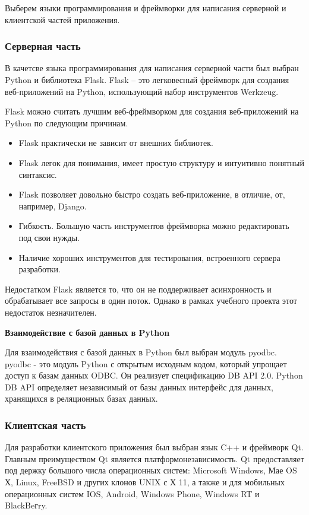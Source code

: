 \documentclass[a4paper,14pt]{article}
\begin{document}
Выберем языки программирования и фреймворки для написания серверной и клиентской частей приложения.

\subsubsection{Серверная часть}

В качетсве языка программирования для написания серверной части был выбран Python и библиотека Flask. Flask -- это легковесный фреймворк для создания веб-приложений на Python, использующий набор инструментов Werkzeug.

Flask можно считать лучшим веб-фреймворком для создания веб-приложений на Python по следующим причинам.

\begin{itemize}
	\item Flask практически не зависит от внешних библиотек.
	\item Flask легок для понимания, имеет простую структуру и интуитивно понятный синтаксис.
	\item Flask позволяет довольно быстро создать веб-приложение, в отличие, от, например, Django.
	\item Гибкость. Большую часть инструментов фреймворка можно редактировать под свои нужды.
	\item Наличие хороших инструментов для тестирования, встроенного сервера разработки.
\end{itemize}

Недостатком Flask является то, что он не поддерживает асинхронность и обрабатывает все запросы в один поток. Однако в рамках учебного проекта этот недостаток незначителен.

\textbf{Взаимодействие с базой данных в Python}

Для взаимодействия с базой данных в Python был выбран модуль pyodbc. pyodbc - это модуль Python с открытым исходным кодом, который упрощает доступ к базам данных ODBC. Он реализует спецификацию DB API 2.0. Python DB API определяет независимый от базы данных интерфейс для данных, хранящихся в реляционных базах данных.

\subsubsection{Клиентская часть}

Для разработки клиентского приложения был выбран язык C++ и фреймворк Qt. Главным преимуществом Qt является платформонезависимость. Qt предоставляет под­
держку большого числа операционных систем: Microsoft Windows, Мае OS Х, Linux,
FreeBSD и других клонов UNIX с Х 11, а также и для мобильных операционных систем IOS,
Android, Windows Phone, Windows RT и BlackBeгry. 
\end{document}
